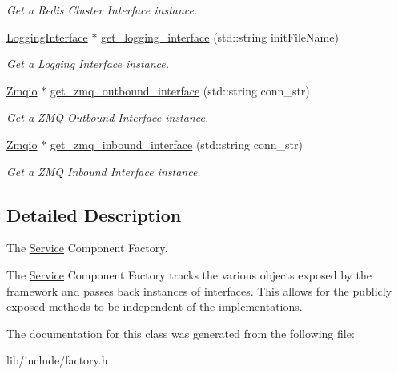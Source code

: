 \begin{DoxyCompactItemize}
\begin{DoxyCompactList}\small\item\em Get a Redis Cluster Interface instance. \end{DoxyCompactList}\item 
\hypertarget{classServiceComponentFactory_aa0bd65f6cb0e588ab97d51ba15733d31}{\hyperlink{classLoggingInterface}{Logging\-Interface} $\ast$ \hyperlink{classServiceComponentFactory_aa0bd65f6cb0e588ab97d51ba15733d31}{get\-\_\-logging\-\_\-interface} (std\-::string init\-File\-Name)}\label{classServiceComponentFactory_aa0bd65f6cb0e588ab97d51ba15733d31}

\begin{DoxyCompactList}\small\item\em Get a Logging Interface instance. \end{DoxyCompactList}\item 
\hypertarget{classServiceComponentFactory_a1d20e28c7b7c88d458598278245ae499}{\hyperlink{classZmqio}{Zmqio} $\ast$ \hyperlink{classServiceComponentFactory_a1d20e28c7b7c88d458598278245ae499}{get\-\_\-zmq\-\_\-outbound\-\_\-interface} (std\-::string conn\-\_\-str)}\label{classServiceComponentFactory_a1d20e28c7b7c88d458598278245ae499}

\begin{DoxyCompactList}\small\item\em Get a Z\-M\-Q Outbound Interface instance. \end{DoxyCompactList}\item 
\hypertarget{classServiceComponentFactory_a01ba58fc37d73d758774635d723dc7f9}{\hyperlink{classZmqio}{Zmqio} $\ast$ \hyperlink{classServiceComponentFactory_a01ba58fc37d73d758774635d723dc7f9}{get\-\_\-zmq\-\_\-inbound\-\_\-interface} (std\-::string conn\-\_\-str)}\label{classServiceComponentFactory_a01ba58fc37d73d758774635d723dc7f9}

\begin{DoxyCompactList}\small\item\em Get a Z\-M\-Q Inbound Interface instance. \end{DoxyCompactList}\end{DoxyCompactItemize}


\subsection{Detailed Description}
The \hyperlink{classService}{Service} Component Factory. 

The \hyperlink{classService}{Service} Component Factory tracks the various objects exposed by the framework and passes back instances of interfaces. This allows for the publicly exposed methods to be independent of the implementations. 

The documentation for this class was generated from the following file\-:\begin{DoxyCompactItemize}
\item 
lib/include/factory.\-h\end{DoxyCompactItemize}
